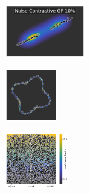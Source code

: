 \begin{figure}[H]
    \centering
    \begin{subfigure}
        \centering
        \includegraphics[width=0.388\textwidth,valign=t]{ood-detection/figures/ood-detection/confidence-line-nc-gp.pdf}
    \end{subfigure}
    \begin{subfigure}
        \centering
        \includegraphics[width=0.254\textwidth,valign=t]{ood-detection/figures/ood-detection/confidence-circle-nc-gp.pdf}
    \end{subfigure}
    \begin{subfigure}
        \centering
        \includegraphics[width=0.308\textwidth,valign=t]{ood-detection/figures/ood-detection/confidence-haystack-nc-gp.pdf}
    \end{subfigure}


\end{figure}
